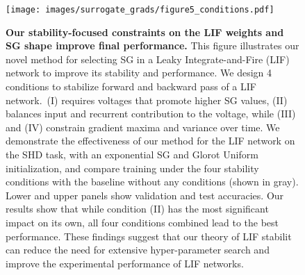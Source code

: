 \begin{figure}
    \texttt{[image: images/surrogate\_grads/figure5\_conditions.pdf]}
    \caption{\textbf{Our stability-focused constraints on the LIF weights and SG shape improve  final performance.} 
    This figure illustrates our novel method for selecting SG in a Leaky Integrate-and-Fire (LIF) network to improve its stability and performance. 
    We design 4 conditions to stabilize forward and backward pass of a LIF network.~(I) requires voltages that promote higher SG values, (II) balances input and recurrent contribution to the voltage, while (III) and (IV) constrain gradient maxima and variance over time. 
    We demonstrate the effectiveness of our method for the LIF network on the SHD task, with an exponential SG and Glorot Uniform initialization, and compare training under the four stability conditions with the baseline without any conditions (shown in gray).
    Lower and upper panels show validation and test accuracies. Our results show that while condition (II) has the most significant impact on its own, all four conditions combined lead to the best performance.
    These findings suggest that our theory of LIF stabilit can reduce the need for extensive hyper-parameter search and improve the experimental performance of LIF networks.}
    \label{fig:conditions}
\end{figure}

